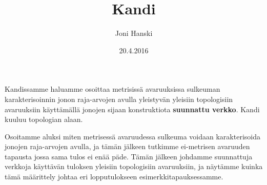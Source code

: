 \documentclass[12pt,a4paper]{article}
\title{Kandi}
\author{Joni Hanski}
\date{20.4.2016}
\begin{document}
\maketitle
Kandissamme haluamme osoittaa metrisissä avaruuksissa sulkeuman karakterisoinnin jonon raja-arvojen avulla yleistyvän yleisiin topologisiin avaruuksiin käyttämällä jonojen sijaan konstruktiota \textbf{suunnattu verkko}. Kandi kuuluu topologian alaan.

Osoitamme aluksi miten metrisessä avaruudessa sulkeuma voidaan karakterisoida jonojen raja-arvojen avulla, ja tämän jälkeen tutkimme ei-metrisen avaruuden tapausta jossa sama tulos ei enää päde. Tämän jälkeen johdamme suunnattuja verkkoja käyttävän tuloksen yleisiin topologisiin avaruuksiin, ja näytämme kuinka tämä määrittely johtaa eri lopputulokseen esimerkkitapauksessamme.
\end{document}
